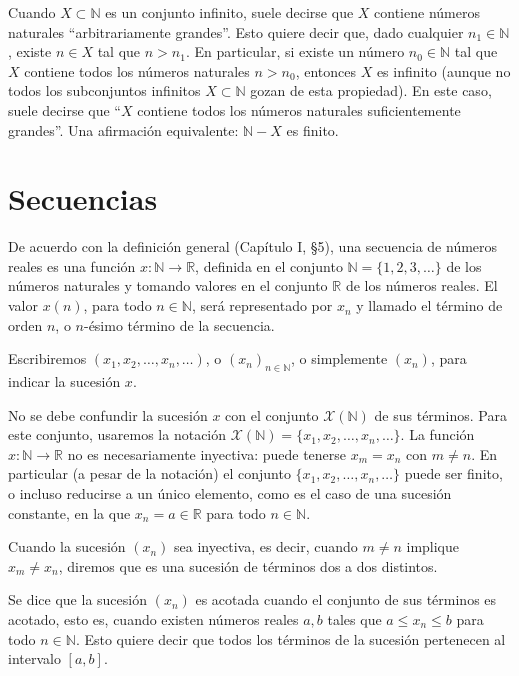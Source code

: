 \documentclass[12pt,oneside]{book}
\begin{document}
Cuando \(X \subset \mathbb{N}\) es un conjunto infinito, suele decirse que \(X\) contiene números naturales “arbitrariamente grandes”. Esto quiere decir que, dado cualquier \(n_1 \in \mathbb{N}\), existe \(n \in X\) tal que \(n > n_1\). En particular, si existe un número \(n_0 \in \mathbb{N}\) tal que \(X\) contiene todos los números naturales \(n > n_0\), entonces \(X\) es infinito (aunque no todos los subconjuntos infinitos \(X \subset \mathbb{N}\) gozan de esta propiedad). En este caso, suele decirse que “\(X\) contiene todos los números naturales suficientemente grandes”. Una afirmación equivalente: \(\mathbb{N} - X\) es finito.

\section{Secuencias}

De acuerdo con la definición general (Capítulo I, §5), una secuencia de números reales es una función \(x: \mathbb{N} \to \mathbb{R}\), definida en el conjunto \(\mathbb{N} = \{1, 2, 3, \dots\}\) de los números naturales y tomando valores en el conjunto \(\mathbb{R}\) de los números reales. El valor \(x(n)\), para todo \(n \in \mathbb{N}\), será representado por \(x_n\) y llamado el término de orden \(n\), o \(n\)-ésimo término de la secuencia.

Escribiremos \((x_1, x_2, \dots, x_n, \dots)\), o \((x_n)_{n \in \mathbb{N}}\), o simplemente \((x_n)\), para indicar la sucesión \(x\).

No se debe confundir la sucesión \(x\) con el conjunto \(\mathcal{X}(\mathbb{N})\) de sus términos. Para este conjunto, usaremos la notación \(\mathcal{X}(\mathbb{N}) = \{x_1, x_2, \dots, x_n, \dots\}\). La función \(x: \mathbb{N} \to \mathbb{R}\) no es necesariamente inyectiva: puede tenerse \(x_m = x_n\) con \(m \neq n\). En particular (a pesar de la notación) el conjunto \(\{x_1, x_2, \dots, x_n, \dots\}\) puede ser finito, o incluso reducirse a un único elemento, como es el caso de una sucesión constante, en la que \(x_n = a \in \mathbb{R}\) para todo \(n \in \mathbb{N}\).

Cuando la sucesión \((x_n)\) sea inyectiva, es decir, cuando \(m \neq n\) implique \(x_m \neq x_n\), diremos que es una sucesión de términos dos a dos distintos.

Se dice que la sucesión \((x_n)\) es acotada cuando el conjunto de sus términos es acotado, esto es, cuando existen números reales \(a, b\) tales que \(a \leq x_n \leq b\) para todo \(n \in \mathbb{N}\). Esto quiere decir que todos los términos de la sucesión pertenecen al intervalo \([a, b]\).
\end{document}
